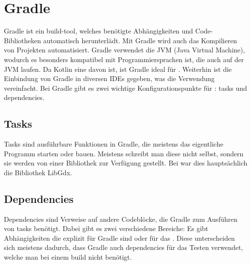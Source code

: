 
\renewcommand{\kapitelautor}{Autor: Felix Zwickelstorfer}
\section{Gradle}\label{sec:gradle}

\renewcommand{\kapitelautor}{Autor: Felix Zwickelstorfer}

Gradle ist ein build-tool, welches benötigte Abhängigkeiten und Code-Bibliotheken automatisch herunterlädt.
Mit Gradle wird auch das Kompilieren von Projekten automatisiert.
Gradle verwendet die JVM (Java Virtual Machine), wodurch es besonders kompatibel mit Programmiersprachen ist, die auch auf der JVM laufen.
Da Kotlin eine davon ist, ist Gradle ideal für \FF.
Weiterhin ist die Einbindung von Gradle in diversen IDEs gegeben, was die Verwendung vereinfacht.
Bei Gradle gibt es zwei wichtige Konfigurationspunkte für \FF: tasks und dependencies.

\subsection{Tasks}\label{subsec:tasks}

Tasks sind ausführbare Funktionen in Gradle, die meistens das eigentliche Programm starten oder bauen.
Meistens schreibt man diese nicht selbst, sondern sie werden von einer Bibliothek zur Verfügung gestellt.
Bei \FF war dies hauptsächlich die Bibliothek LibGdx.

\subsection{Dependencies}\label{subsec:dependencies}

Dependencies sind Verweise auf andere Codeblöcke, die Gradle zum Ausführen von tasks benötigt.
Dabei gibt es zwei verschiedene Bereiche: Es gibt Abhängigkeiten die explizit für Gradle sind oder für das .
Diese unterscheiden sich meistens dadurch, dass Gradle auch dependencies für das Testen verwendet, welche man bei einem build nicht benötigt.
